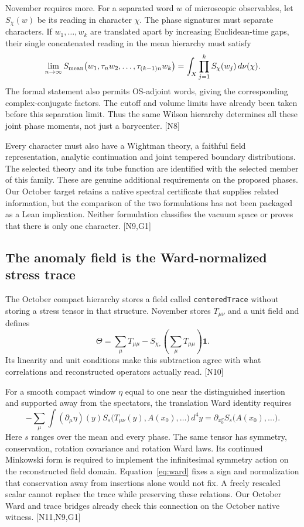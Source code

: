 \documentclass[11pt]{article}
\newcommand{\code}[1]{{\small\nolinkurl{#1}}}
\newcommand{\src}[1]{\textsf{[#1]}}
\begin{document}
November requires more. For a separated word $w$ of microscopic observables,
let $S_\chi(w)$ be its reading in character $\chi$. The phase signatures must
separate characters. If $w_1,\ldots,w_k$ are translated apart by increasing
Euclidean-time gaps, their single concatenated reading in the mean hierarchy
must satisfy
\begin{equation}\label{eq:trains}
 \lim_{n\to\infty} S_{\rm mean}
   \bigl(w_1,\tau_n w_2,\ldots,\tau_{(k-1)n}w_k\bigr)
  =\int_X\prod_{j=1}^k S_\chi(w_j)\,d\nu(\chi).
\end{equation}
The formal statement also permits OS-adjoint words, giving the corresponding
complex-conjugate factors. The cutoff and volume limits have already been
taken before this separation limit. Thus the same Wilson hierarchy
determines all these joint phase moments, not just a barycenter. \src{N8}

Every character must also have a Wightman theory, a faithful field
representation, analytic continuation and joint tempered boundary
distributions. The selected theory and its tube function are identified
with the selected member of this family. These are genuine additional
requirements on the proposed phases. Our October target retains a native
spectral certificate that supplies related information, but the comparison
of the two formulations has not been packaged as a Lean implication.
Neither formulation classifies the vacuum space or proves that there is
only one character. \src{N9,G1}

\subsection{The anomaly field is the Ward-normalized stress trace}

The October compact hierarchy stores a field called \code{centeredTrace}
without storing a stress tensor in that structure. November stores
$T_{\mu\nu}$ and a unit field and defines
\[
 \Theta=\sum_\mu T_{\mu\mu}
       -S_{\chi_*}\!\left(\sum_\mu T_{\mu\mu}\right)\mathbf1.
\]
Its linearity and unit conditions make this subtraction agree with what
correlations and reconstructed operators actually read. \src{N10}

For a smooth compact window $\eta$ equal to one near the distinguished
insertion and supported away from the spectators, the translation Ward
identity requires
\begin{equation}\label{eq:ward}
 -\sum_\mu\int (\partial_\mu\eta)(y)
 S_s\bigl(T_{\mu\nu}(y),A(x_0),\ldots\bigr)\,d^4y
   =\partial_{x_0^\nu}S_s\bigl(A(x_0),\ldots\bigr).
\end{equation}
Here $s$ ranges over the mean and every phase. The same tensor has symmetry,
conservation, rotation covariance and rotation Ward laws. Its continued
Minkowski form is required to implement the infinitesimal symmetry action
on the reconstructed field domain. Equation~\eqref{eq:ward} fixes a sign
and normalization that conservation away from insertions alone would not
fix. A freely rescaled scalar cannot replace the trace while preserving
these relations. Our October Ward and trace bridges already check this
connection on the October native witness. \src{N11,N9,G1}
\end{document}
